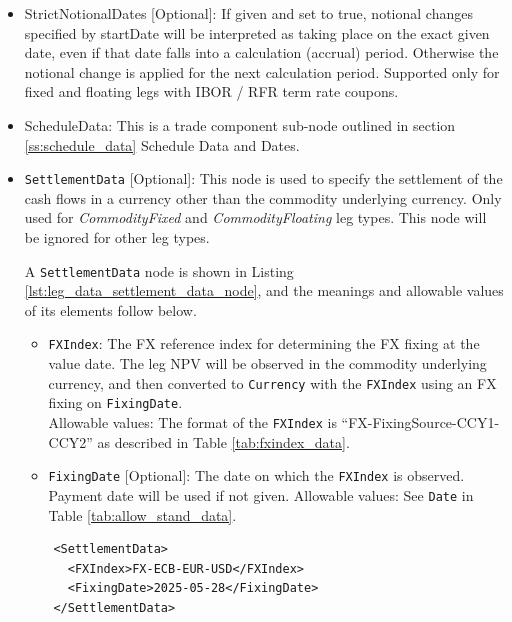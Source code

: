 \begin{itemize}
\item StrictNotionalDates [Optional]: If given and set to true, notional changes specified by startDate will be
  interpreted as taking place on the exact given date, even if that date falls into a calculation (accrual)
  period. Otherwise the notional change is applied for the next calculation period. Supported only for fixed and
  floating legs with IBOR / RFR term rate coupons.
\item ScheduleData: This is a trade component sub-node outlined in section \ref{ss:schedule_data} Schedule Data and
  Dates.
\item \lstinline!SettlementData! [Optional]: This node is used to specify the settlement of the cash flows in a currency other than the commodity underlying currency. Only used for \emph{CommodityFixed} and \emph{CommodityFloating} leg types. This node will be ignored for other leg types.

A \lstinline!SettlementData! node is shown in Listing \ref{lst:leg_data_settlement_data_node}, and the meanings and allowable values of its elements follow below.

\begin{itemize}
\item \lstinline!FXIndex!: The FX reference index for determining the FX fixing at the value date. The leg NPV will be observed in the commodity underlying currency, and then converted to \lstinline!Currency! with the \lstinline!FXIndex! using an FX fixing on \lstinline!FixingDate!. \\
Allowable values: The format of the \lstinline!FXIndex! is ``FX-FixingSource-CCY1-CCY2'' as described in Table \ref{tab:fxindex_data}.
\item \lstinline!FixingDate! [Optional]: The date on which the \lstinline!FXIndex! is observed. Payment date will be used if not given.
Allowable values: See \lstinline!Date! in Table \ref{tab:allow_stand_data}.
\end{itemize}

\begin{listing}[H]
  \begin{verbatim}
    <SettlementData>
      <FXIndex>FX-ECB-EUR-USD</FXIndex>
      <FixingDate>2025-05-28</FixingDate>
    </SettlementData>
  \end{verbatim}
  \caption{Example \lstinline!SettlementData! node with for commodity swap}
  \label{lst:leg_data_settlement_data_node}
\end{listing}


\end{itemize}
